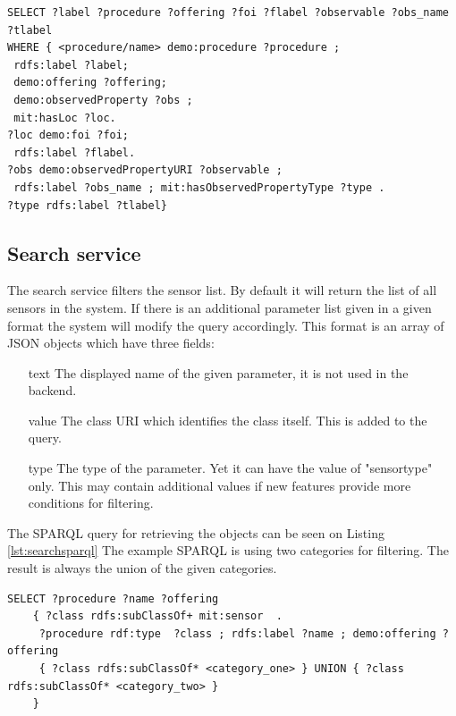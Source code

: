 \begin{lstlisting}[caption={SPARQL query for Capabilities\label{lst:capsparql}}]
SELECT ?label ?procedure ?offering ?foi ?flabel ?observable ?obs_name ?tlabel 
WHERE { <procedure/name> demo:procedure ?procedure ;
 rdfs:label ?label;
 demo:offering ?offering;
 demo:observedProperty ?obs ; 
 mit:hasLoc ?loc.
?loc demo:foi ?foi;
 rdfs:label ?flabel. 
?obs demo:observedPropertyURI ?observable ;
 rdfs:label ?obs_name ; mit:hasObservedPropertyType ?type .
?type rdfs:label ?tlabel}
\end{lstlisting}

\subsection{Search service}
The search service filters the sensor list. By default it will return the list of all sensors in the system. If there is an additional parameter list given in a given format the system will modify the query accordingly. This format is an array of  JSON objects which have three fields: 
\begin{itemize}
\item[text] The displayed name of the given parameter, it is not used in the backend.
\item[value] The class URI which identifies the class itself. This is added to the query.
\item[type] The type of the parameter. Yet it can have the value of "sensortype" only. This may contain additional values if new features provide more conditions for filtering. 
\end{itemize}
The SPARQL query for retrieving the objects can be seen on Listing \ref{lst:searchsparql} The example SPARQL is using two categories for filtering. The result is always the union of the given categories. 

\begin{lstlisting}[caption={SPARQL query for Search\label{lst:searchsparql}}]
SELECT ?procedure ?name ?offering
    { ?class rdfs:subClassOf+ mit:sensor  .
     ?procedure rdf:type  ?class ; rdfs:label ?name ; demo:offering ?offering 
     { ?class rdfs:subClassOf* <category_one> } UNION { ?class rdfs:subClassOf* <category_two> }
    }
\end{lstlisting}


